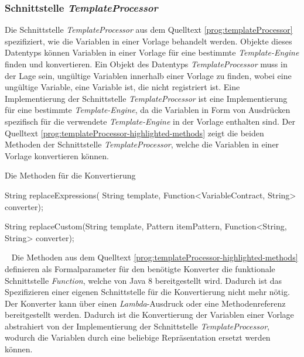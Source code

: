 \subsubsection{Schnittstelle \emph{TemplateProcessor}}
\label{sec:templateProcessor}
Die Schnittstelle \emph{TemplateProcessor} aus dem Quelltext  \ref{prog:templateProcessor} spezifiziert, wie die Variablen in einer Vorlage behandelt werden. Objekte dieses Datentyps können Variablen in einer Vorlage für eine bestimmte \emph{Template-Engine} finden und konvertieren. Ein Objekt des Datentyps \emph{TemplateProcessor} muss in der Lage sein, ungültige Variablen innerhalb einer Vorlage zu finden, wobei eine ungültige Variable, eine Variable ist, die nicht registriert ist. Eine Implementierung der Schnittstelle \emph{TemplateProcessor} ist eine Implementierung für eine bestimmte \emph{Template-Engine}, da die Variablen in Form von Ausdrücken spezifisch für die verwendete \emph{Template-Engine} in der Vorlage enthalten sind. 
\newline
\newline
Der Quelltext \ref{prog:templateProcessor-highlighted-methods} zeigt die beiden Methoden der Schnittstelle \emph{TemplateProcessor}, welche die Variablen in einer Vorlage konvertieren können.
\newpage

\begin{program}[h]
\caption{Die Methoden für die Konvertierung}
\label{prog:templateProcessor-highlighted-methods}
\begin{JavaCode}
String replaceExpressions(
                  String template,
                  Function<VariableContract, String> converter);

String replaceCustom(String template,
                     Pattern itemPattern,
                     Function<String, String> converter);
\end{JavaCode}
\end{program}
\ \newline
Die Methoden aus dem Quelltext \ref{prog:templateProcessor-highlighted-methods} definieren als Formalparameter für den benötigte Konverter die funktionale Schnittstelle \emph{Function}, welche von Java 8 bereitgestellt wird. Dadurch ist das Spezifizieren einer eigenen Schnittstelle für die Konvertierung nicht mehr nötig. Der Konverter kann über einen \emph{Lambda}-Ausdruck oder eine  Methodenreferenz bereitgestellt werden. Dadurch ist die Konvertierung der Variablen einer Vorlage abstrahiert von der Implementierung der Schnittstelle \emph{TemplateProcessor}, wodurch die Variablen durch eine beliebige Repräsentation ersetzt werden können.

